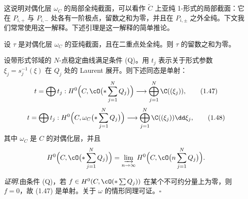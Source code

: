 
这说明对偶化层 $\omega_C$ 的局部全纯截面，可以看作 $\tilde C$ 上亚纯 1-形式的局部截面：它在 $P_{i,+}$ 与 $P_{i,-}$ 处各有一阶极点，留数之和为零，并且在 $P_{i,\pm}$ 之外全纯。下文我们常常使用这一解释。下述引理是这一解释的简单推论。

\begin{lemma}[1.20]
设 $\tau$ 是对偶化层 $\omega_C$ 的亚纯截面，且在二重点处全纯。则 $\tau$ 的留数之和为零。
\end{lemma}

\begin{lemma}[1.21]
设带形式邻域的 $N$-点稳定曲线满足条件 (Q)。用 $t_j$ 表示关于形式参数 $\xi_j=s_j^{-1}(\xi)$ 在 $Q_j$ 处的 Laurent 展开。则下述同态是单射：
\begin{equation}
t=\bigoplus t_j:H^0\Bigl(C,\cO\bigl(\ast\sum_{j=1}^N Q_j\bigr)\Bigr)\longrightarrow\bigoplus_{j=1}^N\C((\xi_j)), \tag{1.47}
\end{equation}
\begin{equation}
t=\bigoplus t_j:H^0\Bigl(C,\omega_C\bigl(\ast\sum_{j=1}^N Q_j\bigr)\Bigr)\longrightarrow\bigoplus_{j=1}^N\C((\xi_j))\dd\xi_j, \tag{1.48}
\end{equation}
其中 $\omega_C$ 是 $C$ 的对偶化层，并且
\[
H^0\Bigl(C,\cO\bigl(\ast\sum_{j=1}^N Q_j\bigr)\Bigr)=\varinjlim_{n\to\infty}H^0\Bigl(C,\cO\bigl(n\sum_{j=1}^N Q_j\bigr)\Bigr).
\]
\end{lemma}


\noindent\textit{证明.}\quad 由条件 (Q)，若 $f\in H^0(C,\cO(\ast\sum Q_j))$ 在某个不可约分量上为零，则 $f=0$，故 (1.47) 是单射。关于 $\omega$ 的情形同理可证。\hfill$\square$

